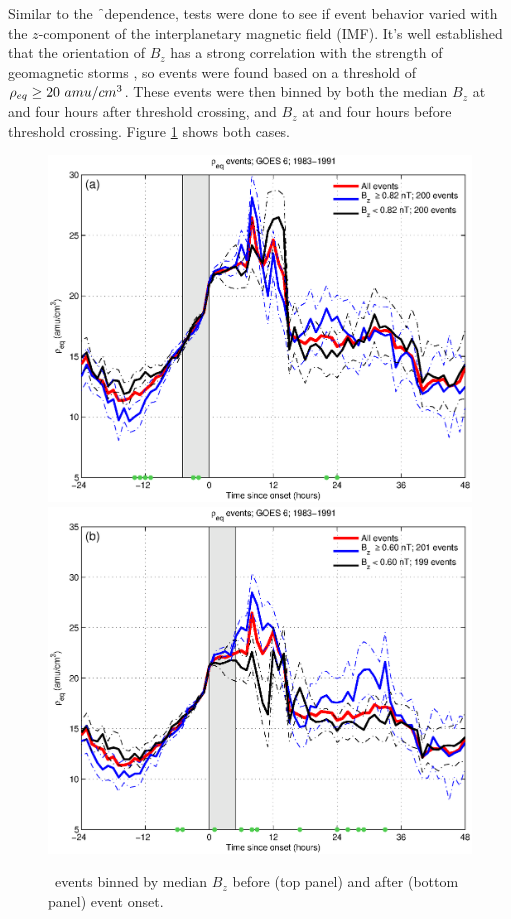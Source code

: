 Similar to the \f\ dependence, tests were done to see if event behavior varied with the $z$-component of the interplanetary magnetic field (IMF). It's well established that the orientation of $B_z$ has a strong correlation with the strength of geomagnetic storms \citep{Takahashi2010SolarCycleVariation}, so events were found based on a threshold of $\rho_{eq} \geq 20~amu/cm^3$. These events were then binned by both the median $B_z$ at and four hours after threshold crossing, and $B_z$ at and four hours before threshold crossing. Figure \ref{fig:RhoBinnedBz} shows both cases.

\begin{figure}[htp!]
	\centering
	\includegraphics[width=0.7\linewidth]{Figures/RhoBinnedB_z-case24-t020-tf25-GOES6}
	\includegraphics[width=0.7\linewidth]{Figures/RhoBinnedB_z-case24-t025-tf30-GOES6}	
	\caption{\req\ events binned by median $B_z$ before (top panel) and after (bottom panel) event onset.}
	\label{fig:RhoBinnedBz}
\end{figure}

